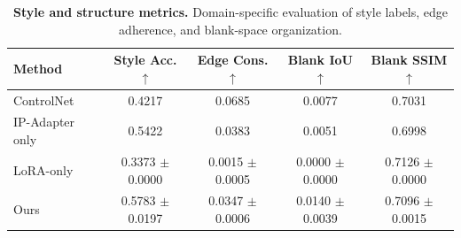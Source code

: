 \begin{table}[t]
\centering
\small
\caption{\textbf{Style and structure metrics.} Domain-specific evaluation of style labels, edge adherence, and blank-space organization.}
\label{tab:style-structure-results}
\begin{tabular}{lcccc}
\toprule
\textbf{Method} & \textbf{Style Acc.$\uparrow$} & \textbf{Edge Cons.$\uparrow$} & \textbf{Blank IoU$\uparrow$} & \textbf{Blank SSIM$\uparrow$} \\
\midrule
ControlNet & 0.4217 & 0.0685 & 0.0077 & 0.7031 \\
IP-Adapter only & 0.5422 & 0.0383 & 0.0051 & 0.6998 \\
LoRA-only & 0.3373 $\pm$ 0.0000 & 0.0015 $\pm$ 0.0005 & 0.0000 $\pm$ 0.0000 & 0.7126 $\pm$ 0.0000 \\
Ours & 0.5783 $\pm$ 0.0197 & 0.0347 $\pm$ 0.0006 & 0.0140 $\pm$ 0.0039 & 0.7096 $\pm$ 0.0015 \\
\bottomrule
\end{tabular}
\end{table}
